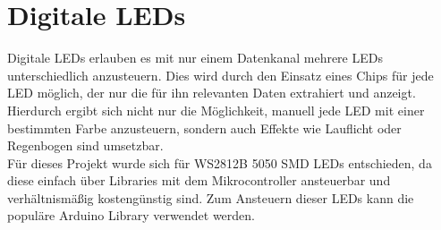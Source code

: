 \section{Digitale LEDs}
Digitale LEDs erlauben es mit nur einem Datenkanal mehrere LEDs unterschiedlich anzusteuern. Dies wird durch den Einsatz eines Chips für jede LED möglich, der nur die für ihn relevanten Daten extrahiert und anzeigt. Hierdurch ergibt sich nicht nur die Möglichkeit, manuell jede LED mit einer bestimmten Farbe anzusteuern, sondern auch Effekte wie Lauflicht oder Regenbogen sind umsetzbar.\\
Für dieses Projekt wurde sich für WS2812B 5050 SMD LEDs entschieden, da diese einfach über Libraries mit dem Mikrocontroller ansteuerbar und verhältnismäßig kostengünstig sind. Zum Ansteuern dieser LEDs kann die populäre Arduino Library  verwendet werden.
